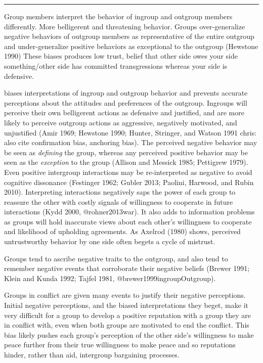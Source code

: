 \documentclass[11pt]{article}
\begin{document}
\begin{center}\rule{0.5\linewidth}{\linethickness}\end{center}

Group members interpret the behavior of ingroup and outgroup members
differently. More belligerent and threatening behavior. Groups
over-generalize negative behaviors of outgroup members as representative
of the entire outgroup and under-generalize positive behaviors as
exceptional to the outgroup (Hewstone 1990) These biases produces low
trust, belief that other side owes your side something/other side has
committed transgressions whereas your side is defensive.

biases interpretations of ingroup and outgroup behavior and prevents
accurate perceptions about the attitudes and preferences of the
outgroup. Ingroups will perceive their own belligerent actions as
defensive and justified, and are more likely to perceive outgroup
actions as aggressive, negatively motivated, and unjustified (Amir 1969;
Hewstone 1990; Hunter, Stringer, and Watson 1991 chris: also cite
confirmation bias, anchoring bias). The perceived negative behavior may
be seen as \emph{defining} the group, whereas any perceived positive
behavior may be seen as the \emph{exception} to the group (Allison and
Messick 1985; Pettigrew 1979). Even positive intergroup interactions may
be re-interpreted as negative to avoid cognitive dissonance (Festinger
1962; Gubler 2013; Paolini, Harwood, and Rubin 2010). Interpreting
interactions negatively saps the power of each group to reassure the
other with costly signals of willingness to cooperate in future
interactions (Kydd 2000, @rohner2013war). It also adds to information
problems as groups will hold inaccurate views about each other's
willingness to cooperate and likelihood of upholding agreements. As
Axelrod (1980) shows, perceived untrustworthy behavior by one side often
begets a cycle of mistrust.

Groups tend to ascribe negative traits to the outgroup, and also tend to
remember negative events that corroborate their negative beliefs (Brewer
1991; Klein and Kunda 1992; Tajfel 1981, @brewer1999ingroupOutgroup).

Groups in conflict are given many events to justify their negative
perceptions. Initial negative perceptions, and the biased
interpretations they beget, make it very difficult for a group to
develop a positive reputation with a group they are in conflict with,
even when both groups are motivated to end the conflict. This bias
likely pushes each group's perception of the other side's willingness to
make peace further from their true willingness to make peace and so
reputations hinder, rather than aid, intergroup bargaining processes.
\end{document}
